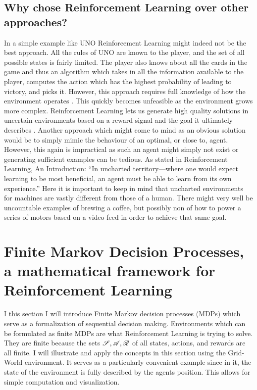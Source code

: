 \subsection{Why chose Reinforcement Learning over other approaches?}\label{subsec:Why_RL}
In a simple example like UNO Reinforcement Learning might indeed not be the best approach. All the rules of UNO are known to the player, and the set of all possible states is fairly limited. The player also knows about all the cards in the game and thus an algorithm which takes in all the information available to the player, computes the action which has the highest probability of leading to victory, and picks it. However, this approach requires full knowledge of how the environment operates \cite[p. 8]{sutton_reinforcement_2018}. This quickly becomes unfeasible as the environment grows more complex. Reinforcement Learning lets us generate high quality solutions in uncertain environments based on a reward signal and the goal it ultimately describes \cite[p. 03]{sutton_reinforcement_2018}. Another approach which might come to mind as an obvious solution would be to simply mimic the behaviour of an optimal, or close to, agent. However, this again is impractical as such an agent might simply not exist or generating sufficient examples can be tedious. As stated in Reinforcement Learning, An Introduction: “In uncharted territory—where one would expect learning to be most beneficial, an agent must be able to learn from its own experience.” \cite[p. 02]{sutton_reinforcement_2018} Here it is important to keep in mind that uncharted environments for machines are vastly different from those of a human. There might very well be uncountable examples of brewing a coffee, but possibly non of how to power a series of motors based on a video feed in order to achieve that same goal.

\section{Finite Markov Decision Processes, a mathematical framework for Reinforcement Learning}\label{sec:MDP} %
I this section I will introduce Finite Markov decision processes (MDPs) which serve as a formalization of sequential decision making. Environments which can be formulated as finite MDPs are what Reinforcement Learning is trying to solve. They are finite because the sets $\mathscr{S}, \mathscr{A}, \mathscr{R}$ of all states, actions, and rewards are all finite. I will illustrate and apply the concepts in this section using the Grid-World environment. It serves as a particularly convenient example since in it, the state of the environment is fully described by the agents position. This allows for simple computation and visualization. 

